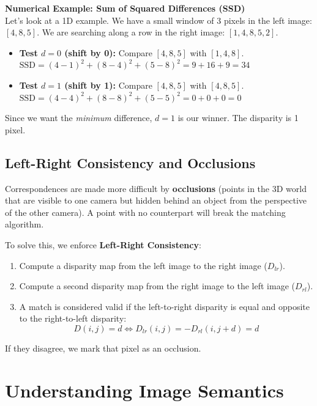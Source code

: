 \documentclass{report}
\begin{document}
\textbf{Numerical Example: Sum of Squared Differences (SSD)}\\
Let's look at a 1D example. We have a small window of 3 pixels in the left image: $[4, 8, 5]$. We are searching along a row in the right image:
 $[1, 4, 8, 5, 2]$.
\begin{itemize}
    \item \textbf{Test $d = 0$ (shift by 0):} Compare $[4, 8, 5]$ with $[1, 4, 8]$.\\
    $\text{SSD} = (4-1)^2 + (8-4)^2 + (5-8)^2 = 9 + 16 + 9 = 34$
    \item \textbf{Test $d = 1$ (shift by 1):} Compare $[4, 8, 5]$ with $[4, 8, 5]$.\\
    $\text{SSD} = (4-4)^2 + (8-8)^2 + (5-5)^2 = 0 + 0 + 0 = 0$
\end{itemize}
Since we want the \textit{minimum} difference, $d=1$ is our winner. The disparity is 1 pixel.

\section{Left-Right Consistency and Occlusions}
Correspondences are made more difficult by \textbf{occlusions} (points in the 3D world that are visible to one camera but hidden behind an object
 from the perspective of the other camera). A point with no counterpart will break the matching algorithm.

To solve this, we enforce \textbf{Left-Right Consistency}:
\begin{enumerate}
    \item Compute a disparity map from the left image to the right image ($D_{lr}$).
    \item Compute a second disparity map from the right image to the left image ($D_{rl}$).
    \item A match is considered valid if the left-to-right disparity is equal and opposite to the right-to-left disparity:
    \begin{equation}
        D(i,j) = d \iff D_{lr}(i,j) = -D_{rl}(i, j+d) = d
    \end{equation}
\end{enumerate}
If they disagree, we mark that pixel as an occlusion.








\chapter{Understanding Image Semantics}
\end{document}
